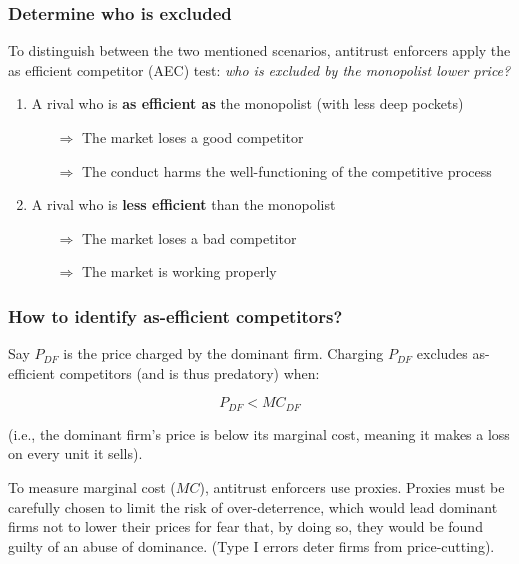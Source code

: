         \subsubsection{Determine who is excluded}

            To distinguish between the two mentioned scenarios, antitrust enforcers apply the as efficient competitor (AEC) test: \textit{who is excluded by the monopolist lower price?}

            \begin{enumerate}
                \item A rival who is \textbf{as efficient as} the monopolist (with less deep pockets)
                \begin{itemize}
                    \item[\(\Rightarrow\)] The market loses a good competitor
                    \item[\(\Rightarrow\)] The conduct harms the well-functioning of the competitive process
                \end{itemize}
                \item A rival who is \textbf{less efficient} than the monopolist
                \begin{itemize}
                    \item[\(\Rightarrow\)] The market loses a bad competitor
                    \item[\(\Rightarrow\)] The market is working properly
                \end{itemize}
            \end{enumerate}

        \subsubsection{How to identify as-efficient competitors?}

            Say \( P_{DF} \) is the price charged by the dominant firm. Charging \( P_{DF} \) excludes as-efficient competitors (and is thus predatory) when:

            \[
            P_{DF} < MC_{DF}
            \]
            
            (i.e., the dominant firm’s price is below its marginal cost, meaning it makes a loss on every unit it sells).
            
            To measure marginal cost (\(MC\)), antitrust enforcers use proxies. Proxies must be carefully chosen to limit the risk of over-deterrence, which would lead dominant firms not to lower their prices for fear that, by doing so, they would be found guilty of an abuse of dominance. (Type I errors deter firms from price-cutting).

